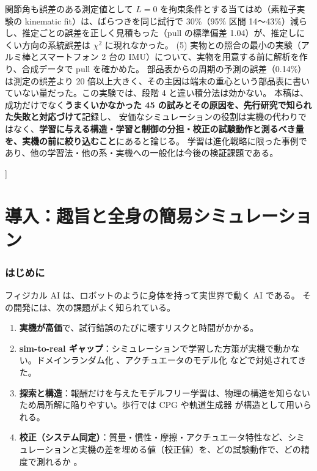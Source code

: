 \documentclass[paper=a4paper,fontsize=10pt,twocolumn,column_gap=2zw,line_length=24zw,number_of_lines=46,head_space=20mm]{jlreq}
\begin{document}
\begin{@twocolumnfalse}
\begin{center}
\begin{minipage}{0.9\textwidth}
関節角も誤差のある測定値として $L=0$ を拘束条件とする当てはめ（素粒子実験の kinematic fit）は、ばらつきを同じ試行で 30\%（95\% 区間 14〜43\%）減らし、推定ごとの誤差を正しく見積もった（pull の標準偏差 1.04）が、推定しにくい方向の系統誤差は $\chi^2$ に現れなかった。
(5) 実物との照合の最小の実験（アルミ棒とスマートフォン 2 台の IMU）について、実物を用意する前に解析を作り、合成データで pull を確かめた。
部品表からの周期の予測の誤差（0.14\%）は測定の誤差より 20 倍以上大きく、その主因は端末の重心という部品表に書いていない量だった。この実験では、段階 4 と違い積分法は効かない。
本稿は、成功だけでなく\textbf{うまくいかなかった 45 の試みとその原因を、先行研究で知られた失敗と対応づけて}記録し、
安価なシミュレーションの役割は実機の代わりではなく、\textbf{学習に与える構造・学習と制御の分担・校正の試験動作と測るべき量を、実機の前に絞り込むこと}にあると論じる。
学習は進化戦略に限った事例であり、他の学習法・他の系・実機への一般化は今後の検証課題である。
\end{minipage}\end{center}
\vspace{1em}
\end{@twocolumnfalse}
]

\part{導入：趣旨と全身の簡易シミュレーション}

\section{はじめに}\label{sec:intro}

フィジカル AI は、ロボットのように身体を持って実世界で動く AI である。
その開発には、次の課題がよく知られている。
\begin{enumerate}\setlength{\itemsep}{0pt}
\item \textbf{実機が高価}で、試行錯誤のたびに壊すリスクと時間がかかる。
\item \textbf{sim-to-real ギャップ}：シミュレーションで学習した方策が実機で動かない。ドメインランダム化 \cite{tobin2017,peng2018}、アクチュエータのモデル化 \cite{hwangbo2019} などで対処されてきた。
\item \textbf{探索と構造}：報酬だけを与えたモデルフリー学習は、物理の構造を知らないため局所解に陥りやすい。歩行では CPG \cite{ijspeert2008} や軌道生成器 \cite{iscen2018} が構造として用いられる。
\item \textbf{校正（システム同定）}：質量・慣性・摩擦・アクチュエータ特性など、シミュレーションと実機の差を埋める値（校正値）を、どの試験動作で、どの精度で測れるか \cite{atkeson1986,gautier1990}。
\end{enumerate}
\end{document}
